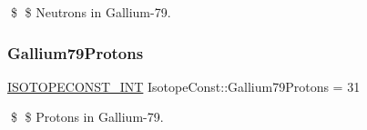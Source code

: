 \$ \$ Neutrons in Gallium-\/79. \mbox{\label{group___isotope_const-_gallium-_ga79_ga4bb20f7ddb22005c466320ba72ea1133}} 
\subsubsection{\texorpdfstring{Gallium79\+Protons}{Gallium79Protons}}
{\footnotesize\ttfamily \mbox{\hyperlink{group___isotope_const-_macros_ga5f18360b3e99483a35c32d789e62621c}{I\+S\+O\+T\+O\+P\+E\+C\+O\+N\+S\+T\+\_\+\+I\+NT}} Isotope\+Const\+::\+Gallium79\+Protons = 31}

\$ \$ Protons in Gallium-\/79. 